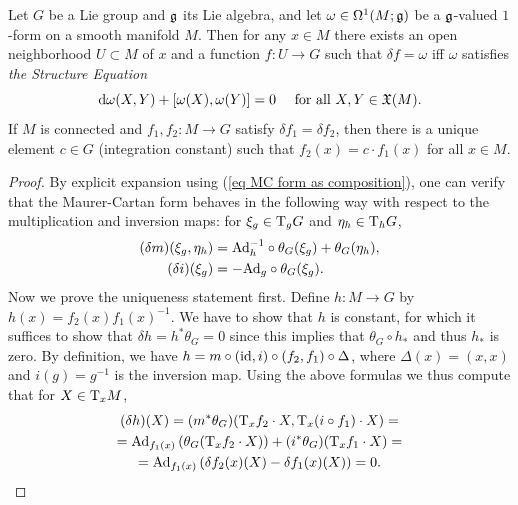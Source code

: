 \begin{thm}\label{thm 6.1 Sharpe fundamental local}
    Let $G$ be a Lie group and $\mathfrak{g}$ its Lie algebra, and let $\omega\in\Omega^1(M;\mathfrak{g})$ be a $\mathfrak{g}$-valued $1$-form on a smooth manifold $M$. Then for any $x\in M$ there exists an open neighborhood $U\subset M$ of $x$ and a function $f:U\to G$ such that $\delta f=\omega$ iff $\omega$ satisfies \emph{the Structure Equation}
    \[{\mathrm{d}} \omega(X,Y)+[\omega(X),\omega(Y)]=0\quad \text{ for all } X,Y\in\mathfrak{X}(M).\]
    If $M$ is connected and $f_1,f_2:M\to G$ satisfy $\delta f_1=\delta f_2$, then there is a unique element $c\in G$ (integration constant) such that $f_2(x)=c\cdot f_1(x)$ for all $x\in M$.
\end{thm}
\begin{proof}
    By explicit expansion using (\ref{eq MC form as composition}), one can verify that the Maurer-Cartan form behaves in the following way with respect to the multiplication and inversion maps: for $\xi_g\in \mathrm{T}_g G$ and $\eta_h\in \mathrm{T}_hG$,
    \begin{align}
       (\delta m)(\xi_g,\eta_h)&=\mathrm{Ad}_{h}^{-1}\circ \theta_G(\xi_g)+\theta_G(\eta_h),   \label{eq MC form under m}  \\
       (\delta i)(\xi_g)&=-\mathrm{Ad}_g\circ\theta_G(\xi_g). \label{eq MC form under i}
    \end{align}
    Now we prove the uniqueness statement first. Define $h:M\to G$ by $h(x)=f_2(x)f_1(x)^{-1}$. We have to show that $h$ is constant, for which it suffices to show that $\delta h=h^\ast\theta_G=0$ since this implies that $\theta_G\circ h_\ast$ and thus $h_\ast$ is zero. By definition, we have $h=m\circ (\operatorname{id},i)\circ(f_2,f_1)\circ \Delta$, where $\Delta(x)=(x,x)$ and $i(g)=g^{-1}$ is the inversion map. Using the above formulas we thus compute that for $X\in \mathrm{T}_xM$,
    \begin{multline}
        (\delta h)(X)=(m^\ast \theta_G)(\mathrm{T}_x f_2\cdot X,\mathrm{T}_x(i\circ f_1)\cdot X)=\\
        =\mathrm{Ad}_{f_1(x)}\left(\theta_G(\mathrm{T}_xf_2\cdot X)\right)+(i^\ast\theta_G)(\mathrm{T}_xf_1\cdot X)=\\
        =\mathrm{Ad}_{f_1(x)}\left(\delta f_2(x)(X)-\delta f_1(x)(X)\right)=0.
    \end{multline}

\end{proof}
